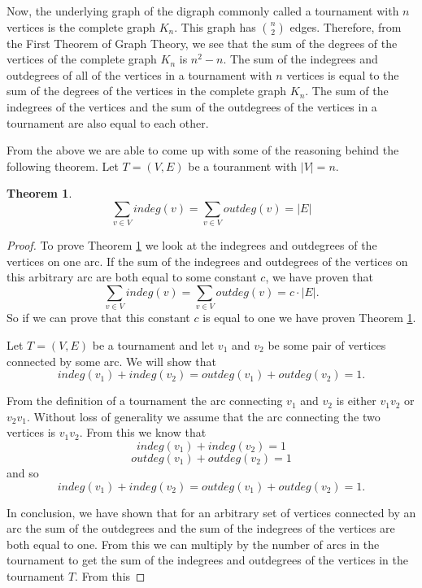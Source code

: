 \documentclass{article}
\newtheorem{thm}{Theorem}
\begin{document}
Now, the underlying graph of the digraph commonly called a tournament with $n$ vertices is the complete graph $K_n$. This graph has $\binom n 2$ edges. Therefore, from the First Theorem of Graph Theory, we see that the sum of the degrees of the vertices of the complete graph $K_n$ is $n^2-n$. The sum of the indegrees and outdegrees of all of the vertices in a tournament with $n$ vertices is equal to the sum of the degrees of the vertices in the complete graph $K_n$. The sum of the indegrees of the vertices and the sum of the outdegrees of the vertices in a tournament are also equal to each other.

From the above we are able to come up with some of the reasoning behind the following theorem. Let $T=(V,E)$ be a touranment with $|V| = n$.
\begin{thm}\label{t8}
\[\sum\limits_{v\in V} indeg(v) = \sum\limits_{v\in V} outdeg(v) = |E|\]
\end{thm}

\begin{proof}
To prove Theorem \ref{t8} we look at the indegrees and outdegrees of the vertices on one arc. If the sum of the indegrees and outdegrees of the vertices on this arbitrary arc are both equal to some constant $c$, we have proven that \[ \sum\limits_{v\in V} indeg(v) = \sum\limits_{v\in V} outdeg(v) = c\cdot |E|.\]
So if we can prove that this constant $c$ is equal to one we have proven Theorem \ref{t8}.

Let $T=(V,E)$ be a tournament and let $v_1$ and $v_2$ be some pair of vertices connected by some arc. We will show that
\[indeg(v_1)+indeg(v_2)=outdeg(v_1)+outdeg(v_2)=1.\]

From the definition of a tournament the arc connecting $v_1$ and $v_2$ is either $v_1v_2$ or $v_2v_1$. Without loss of generality we assume that the arc connecting the two vertices is $v_1v_2$. From this we know that
\[indeg(v_1)+indeg(v_2)=1\]
\[outdeg(v_1)+outdeg(v_2)=1\]
and so
\[indeg(v_1)+indeg(v_2)=outdeg(v_1)+outdeg(v_2)=1.\]

In conclusion, we have shown that for an arbitrary set of vertices connected by an arc the sum of the outdegrees and the sum of the indegrees of the vertices are both equal to one. From this we can multiply by the number of arcs in the tournament to get the sum of the indegrees and outdegrees of the vertices in the tournament $T$.
From this 
\end{proof}
\end{document}
